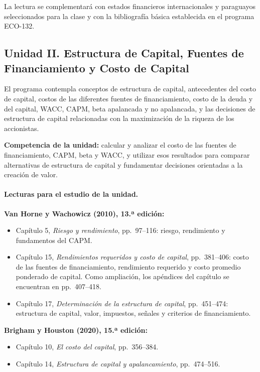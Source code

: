 \documentclass[10pt]{article}
\begin{document}
\noindent
La lectura se complementará con estados financieros internacionales y
paraguayos seleccionados para la clase y con la bibliografía básica establecida
en el programa ECO-132.

\subsection{Unidad II. Estructura de Capital, Fuentes de Financiamiento y Costo de Capital}

El programa contempla conceptos de estructura de capital, antecedentes del
costo de capital, costos de las diferentes fuentes de financiamiento, costo de
la deuda y del capital, WACC, CAPM, beta apalancada y no apalancada, y las
decisiones de estructura de capital relacionadas con la maximización de la
riqueza de los accionistas.
\parencite{uaProgramaFinanzasLargoPlazo}

\textbf{Competencia de la unidad:} calcular y analizar el costo de las fuentes
de financiamiento, CAPM, beta y WACC, y utilizar esos resultados para comparar
alternativas de estructura de capital y fundamentar decisiones orientadas a la
creación de valor.

\paragraph{Lecturas para el estudio de la unidad.}

\textbf{Van Horne y Wachowicz (2010), 13.ª edición:}

\begin{itemize}
    \item Capítulo 5, \textit{Riesgo y rendimiento}, pp.~97--116:
    riesgo, rendimiento y fundamentos del CAPM.
    \item Capítulo 15, \textit{Rendimientos requeridos y costo de capital},
    pp.~381--406: costo de las fuentes de financiamiento, rendimiento requerido
    y costo promedio ponderado de capital. Como ampliación, los apéndices del
    capítulo se encuentran en pp.~407--418.
    \item Capítulo 17, \textit{Determinación de la estructura de capital},
    pp.~451--474: estructura de capital, valor, impuestos, señales y criterios
    de financiamiento.
\end{itemize}

\textbf{Brigham y Houston (2020), 15.ª edición:}
\begin{itemize}
    \item Capítulo 10, \textit{El costo del capital}, pp.~356--384.
    \item Capítulo 14, \textit{Estructura de capital y apalancamiento},
    pp.~474--516.
\end{itemize}
\end{document}
